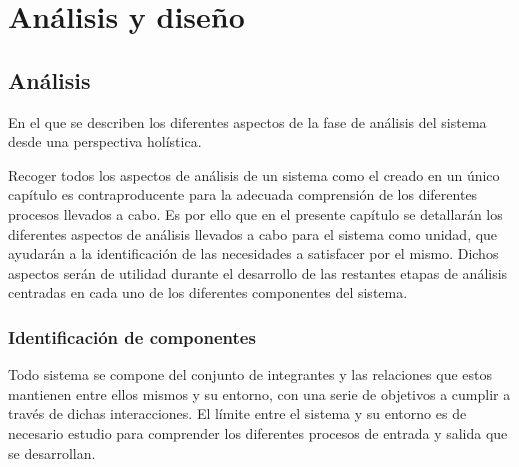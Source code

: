 

\chapter{Análisis y diseño}
\label{chapter:analisis}

\section{Análisis}
\begin{cabstract}
En el que se describen los diferentes aspectos de la fase de análisis del sistema desde una perspectiva holística.
\end{cabstract}

Recoger todos los aspectos de análisis de un sistema como el creado en un único capítulo es contraproducente para la adecuada comprensión de los diferentes procesos llevados a cabo. Es por ello que en el presente capítulo se detallarán los diferentes aspectos de análisis llevados a cabo para el sistema como unidad, que ayudarán a la identificación de las necesidades a satisfacer por el mismo. Dichos aspectos serán de utilidad durante el desarrollo de las restantes etapas de análisis centradas en cada uno de los diferentes componentes del sistema.

\subsection{Identificación de componentes}

Todo sistema se compone del conjunto de integrantes y las relaciones que estos mantienen entre ellos mismos y su entorno, con una serie de objetivos a cumplir a través de dichas interacciones. El límite entre el sistema y su entorno es de necesario estudio para comprender los diferentes procesos de  entrada y salida que se desarrollan.

